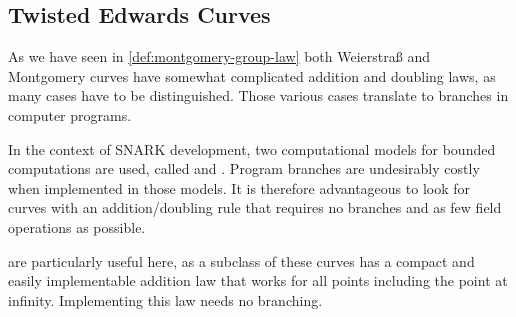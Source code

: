 
\subsection{Twisted Edwards Curves}\label{sec:edwards}
As we have seen in \ref{def:montgomery-group-law} both Weierstraß and Montgomery curves have somewhat complicated addition and doubling laws, as many cases have to be distinguished. Those various cases translate to branches in computer programs.

In the context of SNARK development, two computational models for bounded computations are used, called  and . Program branches are undesirably costly when implemented in those models. It is therefore advantageous to look for curves with an addition/doubling rule that requires no branches and as few field operations as possible.

 are particularly useful here, as a subclass of these curves has a compact and easily implementable addition law that works for all points including the point at infinity. Implementing this law needs no branching. 
